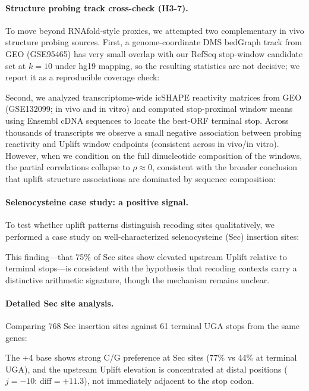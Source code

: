 \paragraph{Structure probing track cross-check (H3-7).}
To move beyond RNAfold-style proxies, we attempted two complementary in vivo structure probing sources.
First, a genome-coordinate DMS bedGraph track from GEO (GSE95465) has very small overlap with our RefSeq stop-window candidate set at $k=10$ under hg19 mapping, so the resulting statistics are not decisive; we report it as a reproducible coverage check:

Second, we analyzed transcriptome-wide icSHAPE reactivity matrices from GEO (GSE132099; in vivo and in vitro) and computed stop-proximal window means using Ensembl cDNA sequences to locate the best-ORF terminal stop.
Across thousands of transcripts we observe a small negative association between probing reactivity and Uplift window endpoints (consistent across in vivo/in vitro).
However, when we condition on the full dinucleotide composition of the windows, the partial correlations collapse to $\rho\approx 0$, consistent with the broader conclusion that uplift--structure associations are dominated by sequence composition:



\paragraph{Selenocysteine case study: a positive signal.}
To test whether uplift patterns distinguish recoding sites qualitatively, we performed a case study on well-characterized selenocysteine (Sec) insertion sites:

This finding---that 75\% of Sec sites show elevated upstream Uplift relative to terminal stops---is consistent with the hypothesis that recoding contexts carry a distinctive arithmetic signature, though the mechanism remains unclear.

\paragraph{Detailed Sec site analysis.}
Comparing 768 Sec insertion sites against 61 terminal UGA stops from the same genes:

The +4 base shows strong C/G preference at Sec sites (77\% vs 44\% at terminal UGA), and the upstream Uplift elevation is concentrated at distal positions ($j=-10$: diff$=+11.3$), not immediately adjacent to the stop codon.

